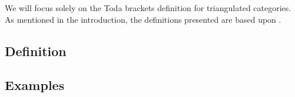 We will focus solely on the Toda brackets definition for triangulated categories. As mentioned in the introduction, the definitions presented are based upon \cite[Definition 3.1]{Christensen-Frankland_2017}.

\subsection{Definition}


\subsection{Examples}
\label{subsec:toda_brackets_examples}
